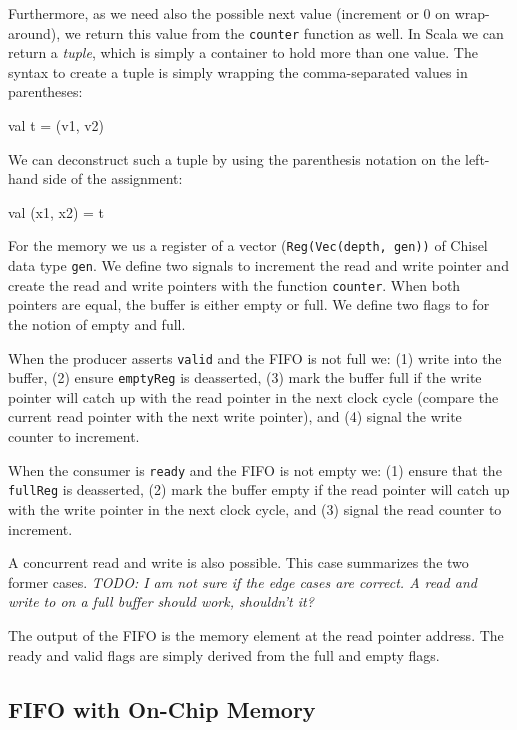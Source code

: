 \documentclass[%
    10pt,
    headinclude, footexclude,
    openright, %
    notitlepage,
    cleardoubleempty,
    headsepline,
    pointlessnumbers,
    bibtotoc, idxtotoc,
    ]{scrbook}
\newcommand{\code}[1]{{\lstinline[basicstyle=\small\ttfamily]{#1}}}
\newcommand{\todo}[1]{{\emph{TODO: #1}}}
\begin{document}
Furthermore, as we need also the
possible next value (increment or 0 on wrap-around), we return this value from
the \code{counter} function as well. In Scala we can return a \emph{tuple},
which is simply a container to hold more than one value. The syntax to create
a tuple is simply wrapping the comma-separated values in parentheses:

\begin{chisel}
  val t = (v1, v2)
\end{chisel}

\noindent We can deconstruct such a tuple by using the parenthesis notation
on the left-hand side of the assignment:

\begin{chisel}
val (x1, x2) = t
\end{chisel}

For the memory we us a register of a vector (\code{Reg(Vec(depth, gen))} of
Chisel data type \code{gen}. We define two signals to increment the read and
write pointer and create the read and write pointers with the function \code{counter}.
When both pointers are equal, the buffer is either empty or full.
We define two flags to for the notion of empty and full.

When the producer asserts \code{valid} and the FIFO is not full we:
(1) write into the buffer, (2) ensure \code{emptyReg} is deasserted,
(3) mark the buffer full if the write pointer will catch up with the read pointer
in the next clock cycle (compare the current read pointer with the next
write pointer), and (4) signal the write counter to increment.

When the consumer is \code{ready} and the FIFO is not empty we:
(1) ensure that the \code{fullReg} is deasserted, (2) mark the buffer
empty if the read pointer will catch up with the write pointer in
the next clock cycle, and (3) signal the read counter to increment.

A concurrent read and write is also possible. This case summarizes
the two former cases. \todo{I am not sure if the edge cases are correct.
A read and write to on a full buffer should work, shouldn't it?}

The output of the FIFO is the memory element at the read pointer address.
The ready and valid flags are simply derived from the full and empty
flags.

\subsection{FIFO with On-Chip Memory}
\end{document}

